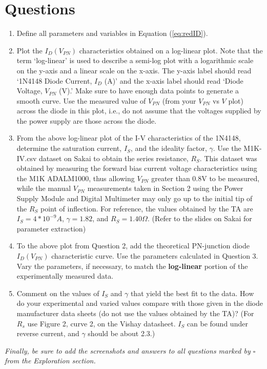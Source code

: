\documentclass[12pt]{../manual}
\begin{document}
\section{Questions}
\begin{enumerate}
\item Define all parameters and variables in Equation (\ref{eq:redID}).
\item Plot the $I_D(V_{PN})$ characteristics obtained on a log-linear plot. Note that the term `log-linear' is used to describe a semi-log plot with a logarithmic scale on the y-axis and a linear scale on the x-axis. The y-axis label should read `1N4148 Diode Current, $I_D$ (A)' and the x-axis label should read `Diode Voltage, $V_{PN}$ (V).' Make sure to have enough data points to generate a smooth curve. Use the measured value of $V_{PN}$ (from your $V_{PN}$ vs $V$ plot) across the diode in this plot, i.e., do not assume that the voltages supplied by the power supply are those across the diode.
\item From the above log-linear plot of the I-V characteristics of the 1N4148, determine the saturation current, $I_S$, and the ideality factor, $\gamma$. Use the M1K-IV.csv dataset on Sakai to obtain the series resistance, $R_S$. This dataset was obtained by measuring the forward bias current voltage characteristics using the M1K ADALM1000, thus allowing $V_{PN}$ greater than 0.8V to be measured, while the manual $V_{PN}$ measurements taken in Section 2 using the Power Supply Module and Digital Multimeter may only go up to the initial tip of the $R_{S}$ point of inflection. For reference, the values obtained by the TA are $I_{S} = 4*10^{-9}A$, $\gamma = 1.82$, and $R_{S} = 1.40 \Omega$. (Refer to the slides on Sakai for parameter extraction)
\item To the above plot from Question 2, add the theoretical PN-junction diode $I_D(V_{PN})$ characteristic curve. Use the parameters calculated in Question 3. Vary the parameters, if necessary, to match the \textbf{log-linear} portion of the experimentally measured data.
\item Comment on the values of $I_S$ and $\gamma$ that yield the best fit to the data. How do your experimental and varied values compare with those given in the diode manufacturer data sheets (do not use the values obtained by the TA)? (For $R_s$ use Figure 2, curve 2, on the Vishay datasheet. $I_S$ can be found under reverse current, and $\gamma$ should be about 2.3.)
\end{enumerate}
\textit{Finally, be sure to add the screenshots and answers to all questions marked by $\square$ from the Exploration section.}
\end{document}
